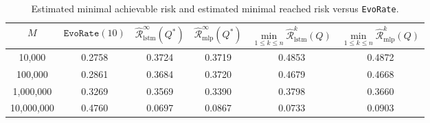 \documentclass{article}
\begin{document}

\begin{table}[ht]
    \centering
    \begin{tabular}{c c c c c c}
        \toprule
         $M$ & $\texttt{EvoRate}(10)$ & $\hat{\mathcal{R}}^{\infty}_{\text{lstm}}(Q^*)$ & $\hat{\mathcal{R}}^{\infty}_{\text{mlp}}(Q^*)$ & $\min\limits_{1\leq k\leq n} 
         \hat{\mathcal{R}}^{k}_{\text{lstm}}(Q)$ & $\min\limits_{1\leq k\leq n} \hat{\mathcal{R}}^{k}_{\text{mlp}}(Q)$ \\
        \midrule
        10{,}000 & 0.2758 & 0.3724& 0.3719& 0.4853 & 0.4872 \\
        100{,}000 & 0.2861 & 0.3684 & 0.3720 & 0.4679 & 0.4668 \\
        1{,}000{,}000  & 0.3269 & 0.3569 & 0.3390 & 0.3798 & 0.3660 \\
        10{,}000{,}000  & 0.4760 & 0.0697 & 0.0867 & 0.0733 & 0.0903 \\
        \bottomrule
    \end{tabular}
    \caption{Estimated minimal achievable risk and estimated minimal reached risk versus \texttt{EvoRate}.}
    \label{tab:loss_comparison}
\end{table}
\end{document}
